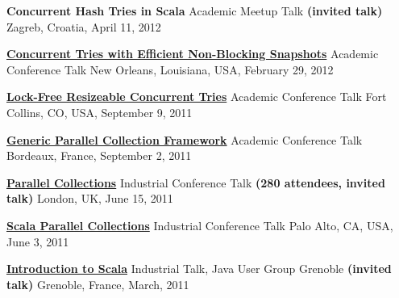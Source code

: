 \documentclass[9pt]{article}
\begin{document}
\noindent
{\bf Concurrent Hash Tries in Scala}
\vspace{-0.03in}
\newline\noindent Academic Meetup Talk \textbf{(invited talk)}
\dates{}
\linebreak\noindent Zagreb, Croatia, April 11, 2012
\bigskip

\noindent\href{http://axel22.github.io/resources/docs/ctries-snapshots.pptx}
{\bf Concurrent Tries with Efficient Non-Blocking Snapshots}
\vspace{-0.03in}
\newline\noindent Academic Conference Talk
\dates{}
\linebreak\noindent New Orleans, Louisiana, USA, February 29, 2012
\bigskip

\noindent
\href{http://lcpc11.cs.colostate.edu/}
{\bf Lock-Free Resizeable Concurrent Tries}
\vspace{-0.03in}
\newline\noindent Academic Conference Talk
\dates{}
\linebreak\noindent Fort Collins, CO, USA, September 9, 2011
\bigskip

\noindent
\href{http://europar2011.bordeaux.inria.fr/conference.php}
{\bf Generic Parallel Collection Framework}
\vspace{-0.03in}
\newline\noindent Academic Conference Talk
\dates{}
\linebreak\noindent Bordeaux, France, September 2, 2011
\bigskip

\noindent\href{https://skillsmatter.com/skillscasts/2236-parallel-collections}
{\bf Parallel Collections}
\vspace{-0.03in}
\newline\noindent Industrial Conference Talk \textbf{(280 attendees, invited talk)}
\dates{}
\linebreak\noindent London, UK, June 15, 2011
\bigskip

\noindent
\href{http://days2011.scala-lang.org/node/138/272/29.%20Parallel%20Collections.mp4}
{\bf Scala Parallel Collections}
\vspace{-0.03in}
\newline\noindent Industrial Conference Talk
\dates{}
\linebreak\noindent Palo Alto, CA, USA, June 3, 2011
\bigskip

\noindent
\href{http://www.slideshare.net/AleksandarProkopec/introduction-to-scala-39540464}
{\bf Introduction to Scala}
\vspace{-0.03in}
\newline\noindent Industrial Talk, Java User Group Grenoble \textbf{(invited talk)}
\dates{}
\linebreak\noindent Grenoble, France, March, 2011
\bigskip
\end{document}
